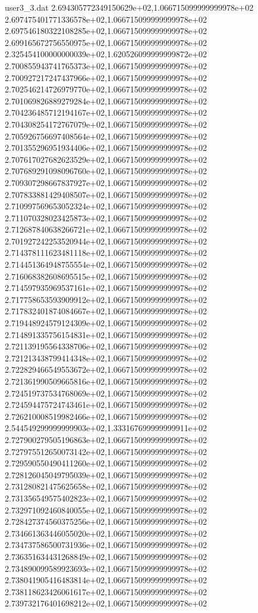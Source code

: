 \begin{filecontents}{user3_3.dat}
2.694305772349150629e+02,1.066715099999999978e+02
2.697475401771336578e+02,1.066715099999999978e+02
2.697546180322108285e+02,1.066715099999999978e+02
2.699165672756550975e+02,1.066715099999999978e+02
2.325454100000000039e+02,1.620526099999999872e+02
2.700855943741765373e+02,1.066715099999999978e+02
2.700927217247437966e+02,1.066715099999999978e+02
2.702546214726979770e+02,1.066715099999999978e+02
2.701069826889279284e+02,1.066715099999999978e+02
2.704236485712194167e+02,1.066715099999999978e+02
2.704308254172767079e+02,1.066715099999999978e+02
2.705926756697408564e+02,1.066715099999999978e+02
2.701355296951934406e+02,1.066715099999999978e+02
2.707617027682623529e+02,1.066715099999999978e+02
2.707689291098096760e+02,1.066715099999999978e+02
2.709307298667837927e+02,1.066715099999999978e+02
2.707833881429408507e+02,1.066715099999999978e+02
2.710997569653052324e+02,1.066715099999999978e+02
2.711070328023425873e+02,1.066715099999999978e+02
2.712687840638266721e+02,1.066715099999999978e+02
2.701927242253520944e+02,1.066715099999999978e+02
2.714378111623481118e+02,1.066715099999999978e+02
2.714451364948755554e+02,1.066715099999999978e+02
2.716068382608695515e+02,1.066715099999999978e+02
2.714597935969537161e+02,1.066715099999999978e+02
2.717758653593909912e+02,1.066715099999999978e+02
2.717832401874084667e+02,1.066715099999999978e+02
2.719448924579124309e+02,1.066715099999999978e+02
2.714891335756154831e+02,1.066715099999999978e+02
2.721139195564338706e+02,1.066715099999999978e+02
2.721213438799414348e+02,1.066715099999999978e+02
2.722829466549553672e+02,1.066715099999999978e+02
2.721361990509665816e+02,1.066715099999999978e+02
2.724519737534768069e+02,1.066715099999999978e+02
2.724594475724743461e+02,1.066715099999999978e+02
2.726210008519982466e+02,1.066715099999999978e+02
2.544549299999999903e+02,1.333167699999999911e+02
2.727900279505196863e+02,1.066715099999999978e+02
2.727975512650073142e+02,1.066715099999999978e+02
2.729590550490411260e+02,1.066715099999999978e+02
2.728126045049795039e+02,1.066715099999999978e+02
2.731280821475625658e+02,1.066715099999999978e+02
2.731356549575402823e+02,1.066715099999999978e+02
2.732971092460840055e+02,1.066715099999999978e+02
2.728427374560375256e+02,1.066715099999999978e+02
2.734661363446055020e+02,1.066715099999999978e+02
2.734737586500731936e+02,1.066715099999999978e+02
2.736351634431268849e+02,1.066715099999999978e+02
2.734890099589923693e+02,1.066715099999999978e+02
2.738041905416483814e+02,1.066715099999999978e+02
2.738118623426061617e+02,1.066715099999999978e+02
2.739732176401698212e+02,1.066715099999999978e+02

\end{filecontents}
